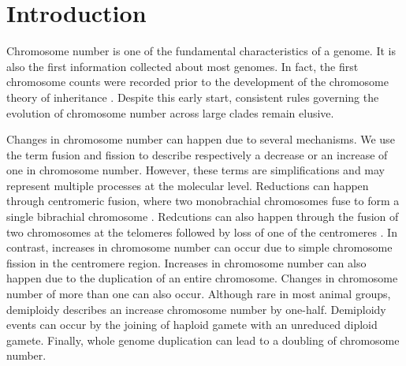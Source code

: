 \section{Introduction}

Chromosome number is one of the fundamental characteristics of a genome.
It is also the first information collected about most genomes. 
In fact, the first chromosome counts were recorded prior to the development of the chromosome theory of inheritance \citep{flemming1882}.
Despite this early start, consistent rules governing the evolution of chromosome number across large clades remain elusive. 

Changes in chromosome number can happen due to several mechanisms.
We use the term fusion and fission to describe respectively a decrease or an increase of one in chromosome number.
However, these terms are simplifications and may represent multiple processes at the molecular level.
Reductions can happen through centromeric fusion, where two monobrachial chromosomes fuse to form a single bibrachial chromosome \citep{oneill2004}. %
Redcutions can also happen through the fusion of two chromosomes at the telomeres followed by loss of one of the centromeres \citep{gordon2011mechanisms, miga2016}. %
In contrast, increases in chromosome number can occur due to simple chromosome fission in the centromere region. %
Increases in chromosome number can also happen due to the duplication of an entire chromosome.
Changes in chromosome number of more than one can also occur.
Although rare in most animal groups, demiploidy describes an increase chromosome number by one-half. 
Demiploidy events can occur by the joining of haploid gamete with an unreduced diploid gamete. %
Finally, whole genome duplication can lead to a doubling of chromosome number. %


